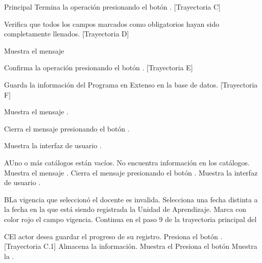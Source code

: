 \begin{UCtrayectoria}{Principal}
	\UCpaso[\UCactor] Termina la operación presionando el botón . [Trayectoria C]
        
    \UCpaso Verifica que todos los campos marcados como obligatorios hayan sido completamente llenados. [Trayectoria D]
    
    \UCpaso Muestra el mensaje 

    \UCpaso[\UCactor] Confirma la operación presionando el botón . [Trayectoria E]
    
    \UCpaso Guarda la información del Programa en Extenso en la base de datos. [Trayectoria F]
    
    \UCpaso Muestra el mensaje .
    
    \UCpaso[\UCactor] Cierra el mensaje presionando el botón .
    
    \UCpaso Muestra la interfaz de usuario .
\end{UCtrayectoria}


\begin{UCtrayectoriaA}{A}{Uno o más catálogos están vacíos.}
	\UCpaso No encuentra información en los catálogos.
    \UCpaso Muestra el mensaje .
    \UCpaso[\UCactor] Cierra el mensaje presionando el botón .
	\UCpaso Muestra la interfaz de usuario .
\end{UCtrayectoriaA}


\begin{UCtrayectoriaA}{B}{La vigencia que seleccionó el docente es invalida.}
	\UCpaso[\UCactor] Selecciona una fecha distinta a la fecha en la que está siendo registrada la Unidad de Aprendizaje.
	\UCpaso Marca con color rojo el campo vigencia.
	\UCpaso Continua en el paso 9 de la trayectoria principal del 
\end{UCtrayectoriaA}


\begin{UCtrayectoriaA}{C}{El actor desea guardar el progreso de su registro.}
\UCpaso[\UCactor] Presiona el botón . [Trayectoria C.1]
\UCpaso Almacena la información.
\UCpaso Muestra el 
\UCpaso[\UCactor] Presiona el botón  
\UCpaso Muestra la .
\end{UCtrayectoriaA}

